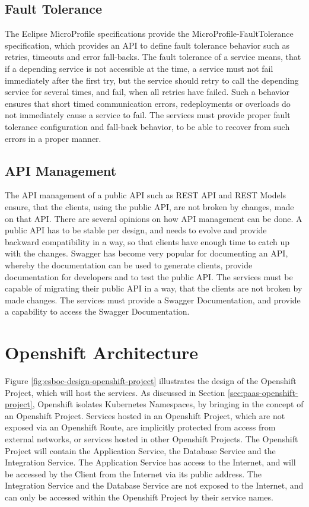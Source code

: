 \subsection{Fault Tolerance}
\label{sec:esboc-requirements-service-fault}
The Eclipse MicroProfile specifications provide the MicroProfile-FaultTolerance specification, which provides an API to define fault tolerance behavior such as retries, timeouts and error fall-backs. The fault tolerance of a service means, that if a depending service is not accessible at the time, a service must not fail immediately after the first try, but the service should retry to call the depending service for several times, and fail, when all retries have failed. Such a behavior ensures that short timed communication errors, redeployments or overloads do not immediately cause a service to fail. The services must provide proper fault tolerance configuration and fall-back behavior, to be able to recover from such errors in a proper manner\cite{EclipseMicroprofileFault2018}.   

\subsection{API Management}
\label{sec:esboc-requirements-service-api}
The API management of a public API such as REST API and REST Models ensure, that the clients, using the public API, are not broken by changes, made on that API. There are several opinions on how API management can be done. A public API has to be stable per design, and needs to evolve and provide backward compatibility in a way, so that clients have enough time to catch up with the changes. Swagger has become very popular for documenting an API, whereby the documentation can be used to generate clients, provide documentation for developers and to test the public API. The services must be capable of migrating their public API in a way, that the clients are not broken by made changes. The services must provide a Swagger Documentation, and provide a capability to access the Swagger Documentation\cite{SmartBearSwagger2018, RestVersion2018}.

\section{Openshift Architecture}
\label{sec:esboc-design-oc}
Figure \vref{fig:esboc-design-openshift-project} illustrates the design of the Openshift Project, which will host the services. As discussed in Section \vref{sec:paas-openshift-project}, Openshift isolates Kubernetes Namespaces, by bringing in the concept of an Openshift Project. Services hosted in an Openshift Project, which are not exposed via an Openshift Route, are implicitly protected from access from external networks, or services hosted in other Openshift Projects. The Openshift Project will contain the Application Service, the Database Service and the Integration Service. The Application Service has access to the Internet, and will be accessed by the Client from the Internet via its public address. The Integration Service and the Database Service are not exposed to the Internet, and can only be accessed within the Openshift Project by their service names.

